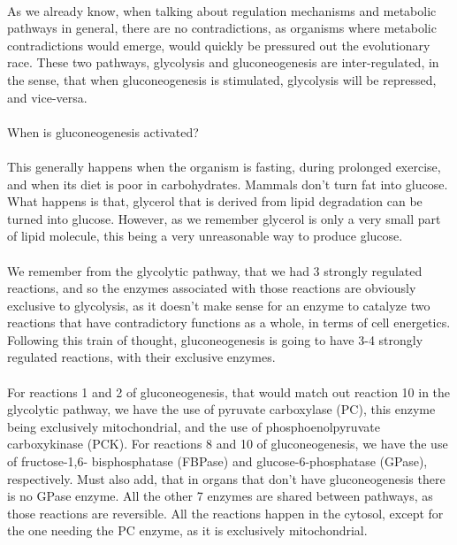\documentclass[12pt,  letterpaper]{article}
\begin{document}
\paragraph*{}
As we already know, when talking about regulation mechanisms and metabolic pathways in general, there are no contradictions, as organisms where metabolic contradictions would emerge, would quickly be pressured out the evolutionary race. These two pathways, glycolysis and gluconeogenesis are inter-regulated, in the sense, that when gluconeogenesis is stimulated, glycolysis will be repressed, and vice-versa.
\paragraph*{}
When is gluconeogenesis activated?
\paragraph*{}
This generally happens when the organism is fasting, during prolonged exercise, and when its diet is poor in carbohydrates. Mammals don't turn fat into glucose. What happens is that, glycerol that is derived from lipid degradation can be turned into glucose. However, as we remember glycerol is only a very small part of lipid molecule, this being a very unreasonable way to produce glucose.\paragraph*{}
We remember from the glycolytic pathway, that we had 3 strongly regulated reactions, and so the enzymes associated with those reactions are obviously exclusive to glycolysis, as it doesn't make sense for an enzyme to catalyze two reactions that have contradictory functions as a whole, in terms of cell energetics. Following this train of thought, gluconeogenesis is going to have 3-4 strongly regulated reactions, with their exclusive enzymes.\paragraph*{}
For reactions 1 and 2 of gluconeogenesis, that would match out reaction 10 in the glycolytic pathway, we have the use of pyruvate carboxylase (PC), this enzyme being exclusively mitochondrial, and the use of phosphoenolpyruvate carboxykinase (PCK). For reactions 8 and 10 of gluconeogenesis, we have the use of fructose-1,6- bisphosphatase (FBPase) and glucose-6-phosphatase (GPase), respectively. Must also add, that in organs that don't have gluconeogenesis there is no GPase enzyme. All the other 7 enzymes are shared between pathways, as those reactions are reversible. All the reactions happen in the cytosol, except for the one needing the PC enzyme, as it is exclusively mitochondrial.
\end{document}
